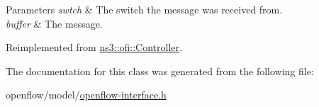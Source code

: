 \begin{DoxyParams}{Parameters}
{\em swtch} & The switch the message was received from. \\
\hline
{\em buffer} & The message. \\
\hline
\end{DoxyParams}


Reimplemented from \hyperlink{classns3_1_1ofi_1_1Controller_a7b2be41ec5105913230a84a6fd18d9c4}{ns3\+::ofi\+::\+Controller}.



The documentation for this class was generated from the following file\+:\begin{DoxyCompactItemize}
\item 
openflow/model/\hyperlink{openflow-interface_8h}{openflow-\/interface.\+h}\end{DoxyCompactItemize}
